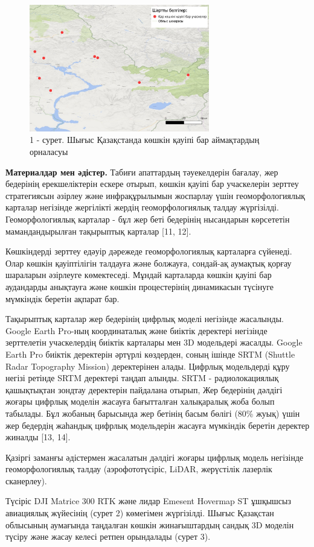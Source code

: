 \begin{figure}[H]
	\centering
	\includegraphics[width=0.7\textwidth]{media/ict2/image199}
	\caption*{1 - сурет. Шығыс Қазақстанда көшкін қауіпі бар аймақтардың орналасуы}
\end{figure}

\begin{multicols}{2}
{\bfseries Материалдар мен әдістер.} Табиғи апаттардың тәуекелдерін
бағалау, жер бедерінің ерекшеліктерін ескере отырып, көшкін қауіпі бар
учаскелерін зерттеу стратегиясын әзірлеу және инфрақұрылымын жоспарлау
үшін геоморфологиялық карталар негізінде жергілікті жердің
геоморфологиялық талдау жүргізілді. Геоморфологиялық карталар - бұл жер
беті бедерінің нысандарын көрсететін мамандандырылған тақырыптық
карталар {[}11, 12{]}.

Көшкіндерді зерттеу едәуір дәрежеде геоморфологиялық карталарға
сүйенеді. Олар көшкін қауіптілігін талдауға және болжауға, сондай-ақ
аумақтық қорғау шараларын әзірлеуге көмектеседі. Мұндай карталарда
көшкін қауіпі бар аудандарды анықтауға және көшкін процестерінің
динамикасын түсінуге мүмкіндік беретін ақпарат бар.

Тақырыптық карталар жер бедерінің цифрлық моделі негізінде жасалынды.
Google Earth Pro-ның координаталық және биіктік деректері негізінде
зерттелетін учаскелердің биіктік карталары мен 3D модельдері жасалды.
Google Earth Pro биіктік деректерін әртүрлі көздерден, соның ішінде SRTM
(Shuttle Radar Topography Mission) деректерінен алады. Цифрлық
модельдерді құру негізі ретінде SRTM деректері таңдап алынды. SRTM -
радиолокациялық қашықтықтан зондтау деректерін пайдалана отырып, Жер
бедерінің дәлдігі жоғары цифрлық моделін жасауға бағытталған халықаралық
жоба болып табылады. Бұл жобаның барысында жер бетінің басым бөлігі
(80\% жуық) үшін жер бедердің жаһандық цифрлық модельдерін жасауға
мүмкіндік беретін деректер жиналды {[}13, 14{]}.

Қазіргі заманғы әдістермен жасалатын дәлдігі жоғары цифрлық модель
негізінде геоморфологиялық талдау (аэрофототүсіріс, LiDAR, жерүстілік
лазерлік сканерлеу).

Түсіріс DJI Matrice 300 RTK және лидар Emesent Hovermap ST ұшқышсыз
авиациялық жүйесінің (сурет 2) көмегімен жүргізілді. Шығыс Қазақстан
облысының аумағында таңдалған көшкін жинағыштардың сандық 3D моделін
түсіру және жасау келесі ретпен орындалады (сурет 3).
\end{multicols}

